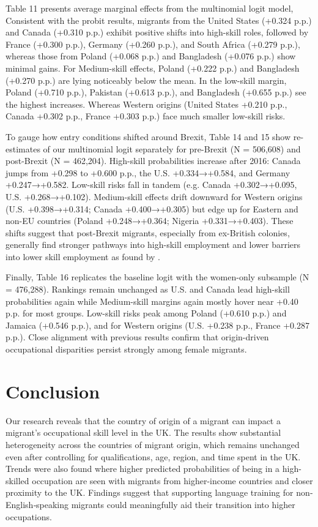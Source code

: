 \documentclass[12pt, a4paper]{article}
\begin{document}
Table 11 presents average marginal effects from the multinomial logit model, Consistent with the probit results, migrants from the United States (+0.324 p.p.) and Canada (+0.310 p.p.) exhibit positive shifts into high-skill roles, followed by France (+0.300 p.p.), Germany (+0.260 p.p.), and South Africa (+0.279 p.p.), whereas those from Poland (+0.068 p.p.) and Bangladesh (+0.076 p.p.) show minimal gains. For Medium-skill effects, Poland (+0.222 p.p.) and Bangladesh (+0.270 p.p.) are lying noticeably below the mean. In the low-skill margin, Poland (+0.710 p.p.), Pakistan (+0.613 p.p.), and Bangladesh (+0.655 p.p.) see the highest increases. Whereas Western origins (United States +0.210 p.p., Canada +0.302 p.p., France +0.303 p.p.) face much smaller low-skill risks. 

To gauge how entry conditions shifted around Brexit, Table 14 and 15 show re-estimates of our multinomial logit separately for pre-Brexit (N = 506,608) and post-Brexit (N = 462,204). High-skill probabilities increase after 2016: Canada jumps from +0.298 to +0.600 p.p., the U.S. +0.334→+0.584, and Germany +0.247→+0.582. Low-skill risks fall in tandem (e.g. Canada +0.302→+0.095, U.S. +0.268→+0.102). Medium-skill effects drift downward for Western origins (U.S. +0.398→+0.314; Canada +0.400→+0.305) but edge up for Eastern and non-EU countries (Poland +0.248→+0.364; Nigeria +0.331→+0.403). These shifts suggest that post-Brexit migrants, especially from ex-British colonies, generally find stronger pathways into high-skill employment and lower barriers into lower skill employment as found by \citet{MattooBrainWaste}.


Finally, Table 16 replicates the baseline logit with the women-only subsample (N = 476,288). Rankings remain unchanged as U.S. and Canada lead high-skill probabilities again while Medium-skill margins again mostly hover near +0.40 p.p. for most groups. Low-skill risks peak among Poland (+0.610 p.p.) and Jamaica (+0.546 p.p.), and for Western origins (U.S. +0.238 p.p., France +0.287 p.p.). Close alignment with previous results confirm that origin-driven occupational disparities persist strongly among female migrants.

\section{Conclusion} \label{sec:conc}

Our research reveals that the country of origin of a migrant can impact a migrant's occupational skill level in the UK. The results show substantial heterogeneity across the countries of migrant origin, which remains unchanged even after controlling for qualifications, age, region, and time spent in the UK. Trends were also found where higher predicted probabilities of being in a high-skilled occupation are seen with migrants from higher-income countries and closer proximity to the UK. Findings suggest that supporting language training for non‐English‐speaking migrants could meaningfully aid their transition into higher occupations.
\end{document}
